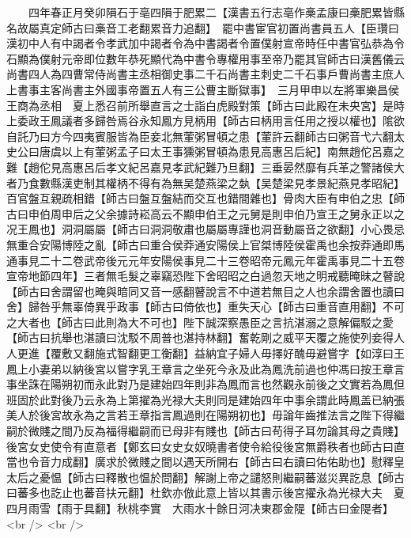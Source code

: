　　四年春正月癸卯隕石于亳四隕于肥累二【漢書五行志亳作槀孟康曰槀肥累皆縣名故屬真定師古曰槀音工老翻累音力追翻】　罷中書宦官初置尚書員五人【臣瓚曰漢初中人有中謁者令孝武加中謁者令為中書謁者令置僕射宣帝時任中書官弘恭為令石顯為僕射元帝即位數年恭死顯代為中書令專權用事至帝乃罷其官師古曰漢舊儀云尚書四人為四曹常侍尚書主丞相御史事二千石尚書主刺史二千石事戶曹尚書主庶人上書事主客尚書主外國事帝置五人有三公曹主斷獄事】　三月甲申以左將軍樂昌侯王商為丞相　夏上悉召前所舉直言之士詣白虎殿對策【師古曰此殿在未央宮】是時上委政王鳳議者多歸咎焉谷永知鳳方見柄用【師古曰柄用言任用之授以權也】隂欲自託乃曰方今四夷賓服皆為臣妾北無葷粥冒頓之患【葷許云翻師古曰粥音弋六翻太史公曰唐虞以上有葷粥孟子曰太王事獯粥冒頓為患見高惠呂后紀】南無趙佗呂嘉之難【趙佗見高惠呂后孝文紀呂嘉見孝武紀難乃旦翻】三垂晏然靡有兵革之警諸侯大者乃食數縣漢吏制其權柄不得有為無吴楚燕梁之埶【吴楚梁見孝景紀燕見孝昭紀】百官盤互親疏相錯【師古曰盤互盤結而交互也錯間雜也】骨肉大臣有申伯之忠【師古曰申伯周申后之父余據詩崧高云不顯申伯王之元舅是則申伯乃宣王之舅永正以之况王鳳也】洞洞屬屬【師古曰洞洞敬肅也屬屬專謹也洞音動屬音之欲翻】小心畏忌無重合安陽博陸之亂【師古曰重合侯莽通安陽侯上官桀博陸侯霍禹也余按莽通即馬通事見二十二卷武帝後元元年安陽侯事見二十三卷昭帝元鳳元年霍禹事見二十五卷宣帝地節四年】三者無毛髮之辜竊恐陛下舍昭昭之白過忽天地之明戒聽晻昧之瞽說【師古曰舍謂留也晻與暗同又音一感翻瞽說言不中道若無目之人也余謂舍置也讀曰舍】歸咎乎無辜倚異乎政事【師古曰倚依也】重失天心【師古曰重音直用翻】不可之大者也【師古曰此則為大不可也】陛下誠深察愚臣之言抗湛溺之意解偏駁之愛【師古曰抗舉也湛讀曰沈駁不周普也湛持林翻】奮乾剛之威平天覆之施使列妾得人人更進【覆敷又翻施式智翻更工衡翻】益納宜子婦人毋擇好醜毋避嘗字【如淳曰王鳳上小妻弟以納後宮以嘗字乳王章言之坐死今永及此為鳳洗前過也仲馮曰按王章言事坐誅在陽朔初而永此對乃是建始四年則非為鳳而言也然觀永前後之文實若為鳳但班固於此對後乃云永為上第擢為光禄大夫則同是建始四年中事余謂此時鳳盖已納張美人於後宮故永為之言若王章指言鳳過則在陽朔初也】毋論年齒推法言之陛下得繼嗣於微賤之間乃反為福得繼嗣而已母非有賤也【師古曰苟得子耳勿論其母之貴賤】後宮女史使令有直意者【鄭玄曰女史女奴曉書者使令給役後宮無爵秩者也師古曰直當也令音力成翻】廣求於微賤之間以遇天所開右【師古曰右讀曰佑佑助也】慰釋皇太后之憂愠【師古曰釋散也愠於問翻】解謝上帝之譴怒則繼嗣蕃滋災異訖息【師古曰蕃多也訖止也蕃音扶元翻】杜欽亦倣此意上皆以其書示後宮擢永為光禄大夫　夏四月雨雪【雨于具翻】秋桃李實　大雨水十餘日河决東郡金隄【師古曰金隄者】<br />
<br />
